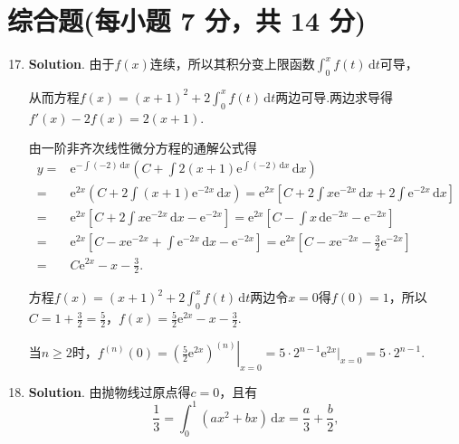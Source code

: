 \documentclass[../Main.tex]{subfiles}
\begin{document}
\section{综合题(每小题 7 分，共 14 分)}
\begin{enumerate}
    \setcounter{enumi}{16}
    \item \textbf{Solution}. 由于$f(x)$连续，所以其积分变上限函数$\int_{0}^{x}
              f(t)\,\mathrm{d}t$可导，

          从而方程$f(x)=(x+1)^{2}+2\int_{0}^{x}f(t)\,\mathrm{d}t$两边可导.两边求导得$f'
              (x)-2f(x)=2(x+1)$.

          由一阶非齐次线性微分方程的通解公式得
          \[
              \begin{aligned}
                  y = & \mathrm{e}^{-\int\left(-2\right)\,\mathrm{d}x}\left(C+\int 2(x+1)\mathrm{e}^{\int\left(-2\right)\,\mathrm{d}x}\,\mathrm{d}x\right)                                                \\
                  =   & \mathrm{e}^{2x}\left(C+2\int (x+1)\mathrm{e}^{-2x}\,\mathrm{d}x\right) = \mathrm{e}^{2x}\left[C+2\int x\mathrm{e}^{-2x}\,\mathrm{d}x+2\int \mathrm{e}^{-2x}\,\mathrm{d}x\right]   \\
                  =   & \mathrm{e}^{2x}\left[C+2\int x\mathrm{e}^{-2x}\,\mathrm{d}x-\mathrm{e}^{-2x}\right] = \mathrm{e}^{2x}\left[C-\int x\,\mathrm{d}\mathrm{e}^{-2x}-\mathrm{e}^{-2x}\right]           \\
                  =   & \mathrm{e}^{2x}\left[C-x\mathrm{e}^{-2x}+\int \mathrm{e}^{-2x}\,\mathrm{d}x-\mathrm{e}^{-2x}\right] = \mathrm{e}^{2x}\left[C-x\mathrm{e}^{-2x}-\frac{3}{2}\mathrm{e}^{-2x}\right] \\
                  =   & C\mathrm{e}^{2x}-x-\frac{3}{2}.
              \end{aligned}
          \]

          方程$f(x)=(x+1)^{2}+2\int_{0}^{x}f(t)\,\mathrm{d}t$两边令$x=0$得$f(0)=1$，所以$C
              =1+\frac{3}{2}=\frac{5}{2}$，$f(x)=\frac{5}{2}\mathrm{e}^{2x}-x-\frac{3}{2}$.

          当$n\geq2$时，$f^{(n)}(0)=\left.\left(\frac{5}{2}\mathrm{e}^{2x}\right)^{(n)}
              \right|_{x=0}=5\cdot 2^{n-1}\mathrm{e}^{2x}\bigg|_{x=0}=5\cdot 2^{n-1}$.

    \item \textbf{Solution}. 由抛物线过原点得$c=0$，且有
          \[
              \frac{1}{3}=\int_{0}^{1}\left(ax^{2}+bx\right)\,\mathrm{d}x=\frac{a}{3}+\frac{b}{2}
              ,
          \]


\end{enumerate}
\end{document}
